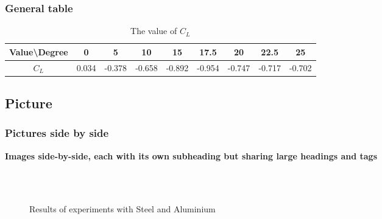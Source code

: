 \subsubsection{General table}
\begin{table}[htp]
	\centering
	\caption{The value of $C_{L}$}
	\label{T 4.3}
	\setlength{\tabcolsep}{2mm} %
	\renewcommand\arraystretch{1} %
 
	\begin{tabular}{cllllllll}
		\hline
		Value\textbackslash{}Degree &
		\multicolumn{1}{c}{0} &
		\multicolumn{1}{c}{5} &
		\multicolumn{1}{c}{10} &
		\multicolumn{1}{c}{15} &
		\multicolumn{1}{c}{17.5} &
		\multicolumn{1}{c}{20} &
		\multicolumn{1}{c}{22.5} &
		\multicolumn{1}{c}{25} \\ \hline
		$C_L$ &
		0.034 &
		-0.378 &
		-0.658 &
		-0.892 &
		-0.954 &
		-0.747 &
		-0.717 &
		-0.702 \\ \hline
	\end{tabular}
\end{table}
\newpage

\subsection{Picture}

\subsubsection{Pictures side by side}
\textbf{Images side-by-side, each with its own subheading but sharing large headings and tags}
\begin{figure}[htp]
	\centering
	\\
	\centering
	\\
	\centering
	\caption{Results of experiments with Steel and Aluminium} %
	\label{F 1.1}
\end{figure}

